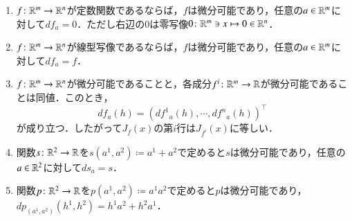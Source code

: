 \begin{prop}\label{微分の基本性質}
\leavevmode
\begin{enumerate}
\item $f \colon \mathbb{R}^m \to \mathbb{R}^n$が定数関数であるならば，$f$は微分可能であり，任意の$a \in \mathbb{R}^m$に対して$df_a = 0$．ただし右辺の$0$は零写像$0 \colon \mathbb{R}^m \ni x \mapsto 0 \in \mathbb{R}^n$．
\item $f \colon \mathbb{R}^m \to \mathbb{R}^n$が線型写像であるならば，$f$は微分可能であり，任意の$a \in \mathbb{R}^m$に対して$df_a = f$．
\item $f \colon \mathbb{R}^m \to \mathbb{R}^n$が微分可能であることと，各成分$f^i \colon \mathbb{R}^m \to \mathbb{R}$が微分可能であることは同値．このとき，
\begin{equation}
df_a(h) = (d{f^1}_a(h), \cdots, d{f^n}_a(h))^\top
\end{equation}が成り立つ．したがって$J_f(x)$の第$i$行は$J_{f^i}(x)$に等しい．
\item 関数$s \colon \mathbb{R}^2 \to \mathbb{R}$を$s(a^1,a^2) \coloneqq a^1+a^2$で定めると$s$は微分可能であり，任意の$a \in \mathbb{R}^2$に対して$ds_a = s$．
\item 関数$p \colon \mathbb{R}^2 \to \mathbb{R}$を$p(a^1,a^2) \coloneqq a^1a^2$で定めると$p$は微分可能であり，$dp_{(a^1,a^2)}(h^1,h^2) = h^1a^2+h^2a^1$．
\end{enumerate}
\end{prop}

